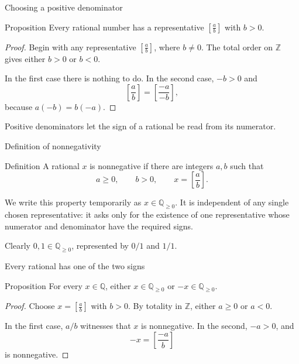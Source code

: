 \documentclass[aspectratio=169,11pt]{beamer}
\newcommand{\Z}{\mathbb Z}
\newcommand{\Q}{\mathbb Q}
\newcommand{\qcl}[2]{\left[\frac{#1}{#2}\right]}
\begin{document}
\begin{frame}{Choosing a positive denominator}
  \begin{block}{Proposition}
    Every rational number has a representative \(\qcl ab\) with \(b>0\).
  \end{block}

  \begin{proof}
    Begin with any representative \(\qcl ab\), where \(b\ne0\).  The total
    order on \(\Z\) gives either \(b>0\) or \(b<0\).

    In the first case there is nothing to do.  In the second case, \(-b>0\)
    and
    \[
      \qcl ab=\qcl{-a}{-b},
    \]
    because \(a(-b)=b(-a)\).
  \end{proof}

  Positive denominators let the sign of a rational be read from its numerator.
\end{frame}

\begin{frame}{Definition of nonnegativity}
  \begin{block}{Definition}
    A rational \(x\) is \alert{nonnegative} if there are integers \(a,b\) such
    that
    \[
      a\ge0,\qquad b>0,
      \qquad x=\qcl ab.
    \]
  \end{block}

  We write this property temporarily as \(x\in\Q_{\ge0}\).  It is independent
  of any single chosen representative: it asks only for the existence of one
  representative whose numerator and denominator have the required signs.

  Clearly \(0,1\in\Q_{\ge0}\), represented by \(0/1\) and \(1/1\).
\end{frame}

\begin{frame}{Every rational has one of the two signs}
  \begin{block}{Proposition}
    For every \(x\in\Q\), either \(x\in\Q_{\ge0}\) or
    \(-x\in\Q_{\ge0}\).
  \end{block}

  \begin{proof}
    Choose \(x=\qcl ab\) with \(b>0\).  By totality in \(\Z\), either
    \(a\ge0\) or \(a<0\).

    In the first case, \(a/b\) witnesses that \(x\) is nonnegative.  In the
    second, \(-a>0\), and
    \[
      -x=\qcl{-a}b
    \]
    is nonnegative.
  \end{proof}
\end{frame}
\end{document}
